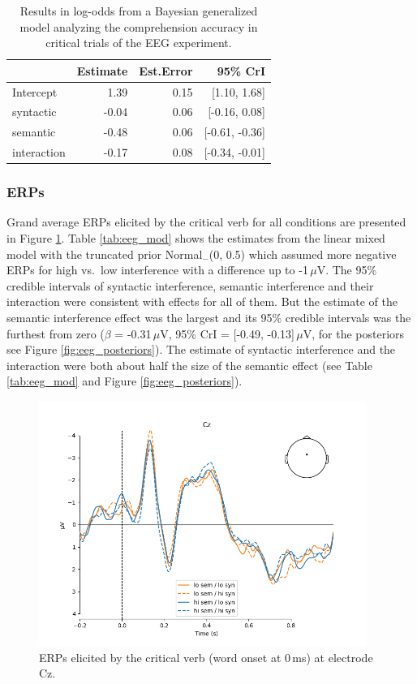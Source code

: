 \documentclass[a4paper, man, floatsintext]{apa7}
\begin{document}
\begin{table}[]
    \caption{Results in log-odds from a Bayesian generalized model analyzing the comprehension accuracy in critical trials of the EEG experiment.}
    \label{tab:eeg_acc_mod}
    \centering
    \begin{tabular}{lrrr}
    \toprule
    & Estimate & Est.Error & 95\% CrI  \\
    \midrule
Intercept& 1.39 & 0.15&  [1.10, 1.68]\\
syntactic& -0.04 & 0.06& [-0.16, 0.08]\\
semantic&  -0.48 & 0.06& [-0.61, -0.36]\\
interaction& -0.17& 0.08& [-0.34, -0.01]\\
    \bottomrule
    \end{tabular}
\end{table}

\subsubsection{ERPs}
Grand average ERPs elicited by the critical verb for all conditions are presented in Figure \ref{fig:erp_all}. Table \ref{tab:eeg_mod} shows the estimates from the linear mixed model with the truncated prior Normal$_-$(0, 0.5) which assumed more negative ERPs for high vs.\ low interference with a difference up to -1\,$\mu$V. The 95\% credible intervals of syntactic interference, semantic interference and their interaction were consistent with effects for all of them. But the estimate of the semantic interference effect was the largest and its 95\% credible intervals was the furthest from zero ($\beta$ = -0.31\,$\mu$V, 95\% CrI = [-0.49, -0.13]\,$\mu$V, for the posteriors see Figure \ref{fig:eeg_posteriors}). The estimate of syntactic interference and the interaction were both about half the size of the semantic effect (see Table \ref{tab:eeg_mod} and Figure \ref{fig:eeg_posteriors}).

\begin{figure}[H]
    \caption{ERPs elicited by the critical verb (word onset at 0\,ms) at electrode Cz.}
    \label{fig:erp_all}
    \centering
    \includegraphics[width=0.95\textwidth]{images/N_103_Cz_crit.png}
\end{figure}
\end{document}
